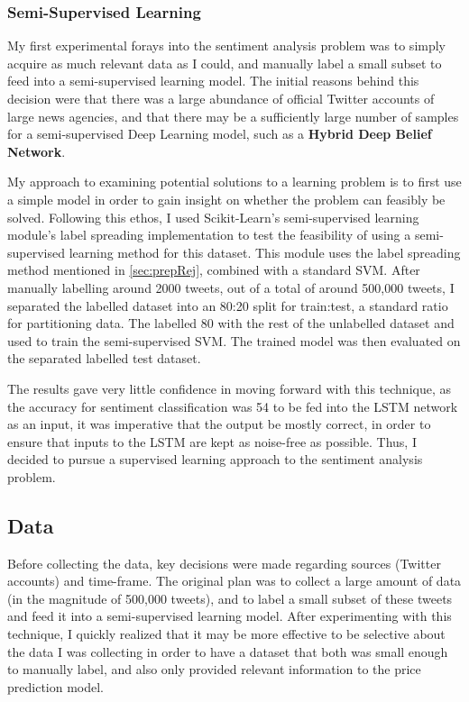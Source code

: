 \documentclass[12pt,a4paper,twoside,openright]{report}
\begin{document}
\subsubsection{Semi-Supervised Learning}
\label{sec:semi}
My first experimental forays into the sentiment analysis problem was to
simply acquire as much relevant data as I could, and manually label a small subset
to feed into a semi-supervised learning model. The initial reasons behind this decision
were that there was a large abundance of official Twitter accounts of large news
agencies, and that there may be a sufficiently large number of samples for a
semi-supervised Deep Learning model, such as a \textbf{Hybrid Deep Belief Network}\cite{Zhou14}.

My approach to examining potential solutions to a learning problem is to first
use a simple model in order to gain insight on whether the problem can feasibly
be solved. Following this ethos, I used Scikit-Learn's semi-supervised learning module's
label spreading implementation to test the feasibility of using a semi-supervised learning
method for this dataset. This module uses the label spreading method mentioned in
\cref{sec:prepRej}, combined with a standard SVM.
After manually labelling around 2000 tweets, out of a total of
around 500,000 tweets, I separated the labelled dataset into an 80:20 split for train:test,
a standard ratio for partitioning data. The labelled 80%
with the rest of the unlabelled dataset and used to train the semi-supervised SVM. The
trained model was then evaluated on the separated labelled test dataset. 

The results gave very little confidence in moving forward with this technique, as the accuracy 
for sentiment classification was 54%
to be fed into the LSTM network as an input, it was imperative that the output be mostly correct,
in order to ensure that inputs to the LSTM are kept as noise-free as possible. Thus, I decided to
pursue a supervised learning approach to the sentiment analysis problem.

\subsection{Data}
\label{sec:impSentiData}

Before collecting the data, key decisions were made regarding sources (Twitter accounts)
and time-frame. The original plan was to collect a large amount of data (in the magnitude
of 500,000 tweets), and to label a small subset of these tweets and feed it into a
semi-supervised learning model. After experimenting with this technique, I quickly realized
that it may be more effective to be selective about the data I was collecting in order to
have a dataset that both was small enough to manually label, and also only provided relevant 
information to the price prediction model. 
\end{document}
